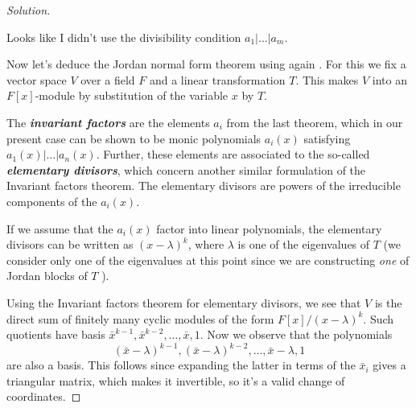 \begin{proof}[Solution]
	\begin{remark}
		Looks like I didn't use the divisibility condition $a_1|\ldots|a_m$.
	\end{remark}

	Now let's deduce the Jordan normal form theorem using again  \cite{dummit}. For this we fix a vector space $V$ over a field $F$ and a linear transformation $T$. This  makes $V$ into an $F[x]$-module by substitution of the variable $x$ by $T$.

	The \textit{\textbf{invariant factors}} are the elements $a_i$ from the last theorem, which in our present case can be shown to be monic polynomials $a_i(x)$ satisfying $a_1(x)|\ldots|a_n(x)$. Further, these elements are associated to the so-called  \textit{\textbf{elementary divisors}}, which concern another similar formulation of the Invariant factors theorem. The elementary divisors are powers of the irreducible components of the $a_i(x)$.

	If we assume that the  $a_i(x)$ factor into linear polynomials, the elementary divisors can be written as $(x-\lambda)^k$, where $\lambda$ is one of the eigenvalues of $T$ (we consider only one of the eigenvalues at this point since we are constructing \textit{one} of Jordan blocks of $T$ ).

	Using the Invariant factors theorem for elementary divisors, we see that $V$ is the direct sum of finitely many cyclic modules of the form $F[x]/(x-\lambda)^k$. Such quotients have basis $\bar{x}^{k-1},\bar{x}^{k-2},\ldots,\bar{x},1$. Now we observe that the polynomials
	\[(\bar{x}-\lambda)^{k-1},(\bar{x}-\lambda)^{k-2},\ldots,\bar{x}-\lambda,1\]
are also a basis. This follows since expanding the latter in terms of the $\bar{x}_i$ gives a triangular matrix, which makes it invertible, so it's a valid change of coordinates.


\end{proof}
